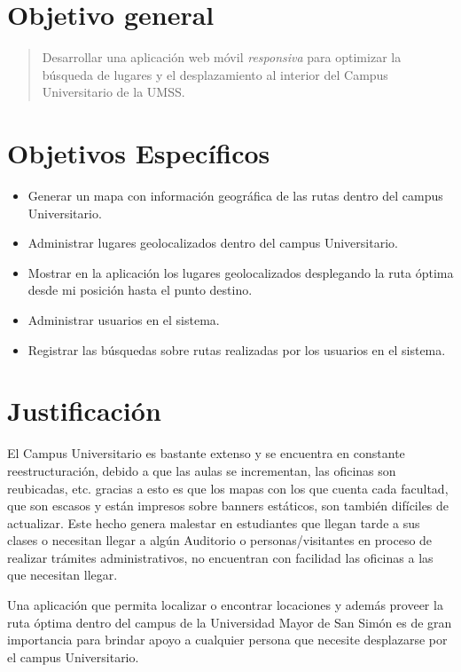   \section{Objetivo general} %
  \label{sec:objetivo_general}
    \begin{quote}
      Desarrollar una aplicación web móvil \emph{responsiva} para optimizar la búsqueda de lugares y el  desplazamiento al interior del Campus Universitario de la UMSS.
    \end{quote}


  \section{Objetivos Específicos} %
  \label{sec:obj_especificos}
    \begin{itemize}
      \item Generar un mapa con información geográfica de las rutas dentro del campus Universitario.
      \item Administrar lugares geolocalizados dentro del campus Universitario.
      \item Mostrar en la aplicación los lugares geolocalizados desplegando la ruta óptima desde mi posición hasta el punto destino.
      \item Administrar usuarios en el sistema.
      \item Registrar las búsquedas sobre rutas realizadas por los usuarios en el sistema.
    \end{itemize}


  \section{Justificación} %
  \label{sec:justificacion}

  El Campus Universitario es bastante extenso y se encuentra en constante reestructuración, debido a que las aulas se incrementan, las oficinas son reubicadas, etc. gracias a esto es que los mapas con los que cuenta cada facultad, que son escasos y están impresos sobre banners estáticos, son también difíciles de actualizar. Este hecho genera malestar en estudiantes que llegan tarde a sus clases o necesitan llegar a algún Auditorio o personas/visitantes en proceso de realizar trámites administrativos, no encuentran con facilidad las oficinas a las que necesitan llegar.

  Una aplicación que permita localizar o encontrar locaciones y además proveer la ruta óptima dentro del campus de la Universidad Mayor de San Simón es de gran importancia para brindar apoyo a cualquier persona que necesite desplazarse por el campus Universitario.

